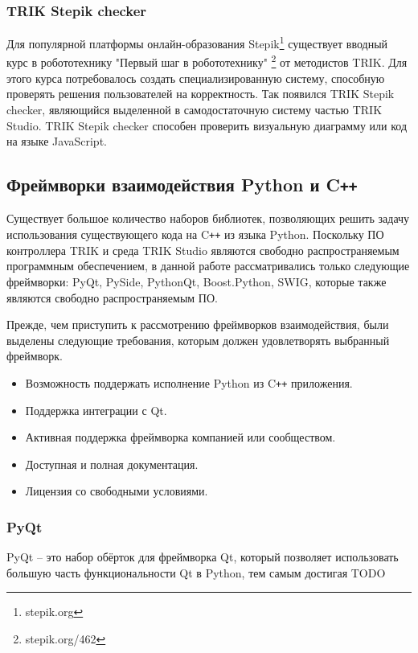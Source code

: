 \documentclass[14pt]{matmex-diploma-custom}
\begin{document}
\subsubsection{TRIK Stepik checker}
Для популярной платформы онлайн-образования Stepik\footnote{stepik.org} существует вводный курс в робототехнику "Первый шаг в робототехнику" \footnote{stepik.org/462} от методистов TRIK. Для этого курса потребовалось создать специализированную систему, способную проверять решения пользователей на корректность. Так появился TRIK Stepik checker, являющийся выделенной в самодостаточную систему частью TRIK Studio. TRIK Stepik checker способен проверить визуальную диаграмму или код на языке JavaScript.

\subsection{Фреймворки взаимодействия Python и C\texttt{++}}

Существует большое количество наборов библиотек, позволяющих решить задачу использования существующего кода на C\texttt{++} из языка Python. Поскольку ПО контроллера TRIK и среда TRIK Studio являются свободно распространяемым программным обеспечением, в данной работе рассматривались только следующие фреймворки: PyQt, PySide, PythonQt, Boost.Python, SWIG, которые также являются свободно распространяемым ПО.

Прежде, чем приступить к рассмотрению фреймворков взаимодействия, были выделены следующие требования, которым должен удовлетворять выбранный фреймворк.

\begin{itemize}
    \item Возможность поддержать исполнение Python из C\texttt{++} приложения.
    \item Поддержка интеграции с Qt.
    \item Активная поддержка фреймворка компанией или сообществом.
    \item Доступная и полная документация.
    \item Лицензия со свободными условиями.
\end{itemize}

\subsubsection{PyQt}

PyQt \cite{pyqt} -- это набор обёрток для фреймворка Qt, который позволяет использовать большую часть функциональности Qt в Python, тем самым достигая TODO
\end{document}
